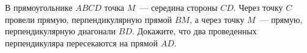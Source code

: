 \begin{problems}
\item В прямоугольнике $ABCD$ точка $M$~--- середина стороны $CD$. Через точку $C$ провели прямую, перпендикулярную прямой $BM$, а через точку $M$~--- прямую, перпендикулярную диагонали $BD$. Докажите, что два проведенных перпендикуляра пересекаются на прямой $AD$.


\end{problems}
